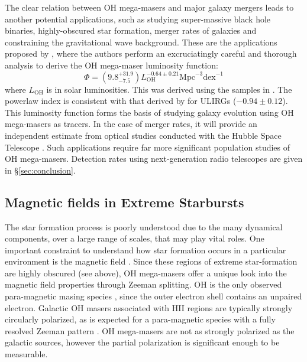 The clear relation between OH mega-masers and major galaxy mergers leads to another potential applications, such as studying super-massive black hole binaries, highly-obscured star formation, merger rates of galaxies \citep{darling_2001_merger} and constraining the gravitational wave background. These are the applications proposed by \citet{darling2002_lumfunc}, where the authors perform an excruciatingly careful and thorough analysis to derive the OH mega-maser luminosity function:
\begin{equation}
\label{eq:oh_lum}
\Phi = \left( 9.8^{+31.9}_{-7.5} \right)L_{\mathrm{OH}}^{-0.64\pm0.21} \mathrm{Mpc}^{-3} \mathrm{dex}^{-1}
\end{equation}
where $L_{\mathrm{OH}}$ is in solar luminosities. This was derived using the samples in \citet{darling2002_paperIII}. The powerlaw index is consistent with that derived by \citet{Kim_1998} for ULIRGs ($-0.94\pm0.12$). This luminosity function forms the basis of studying galaxy evolution using OH mega-masers as tracers. In the case of merger rates, it will provide an independent estimate from optical studies conducted with the Hubble Space Telescope \citep{Kim_1998}. Such applications require far more significant population studies of OH mega-masers. Detection rates using next-generation radio telescopes are given in \S\ref{sec:conclusion}.

\subsection{Magnetic fields in Extreme Starbursts}
\label{sub:oh_zeeman}

The star formation process is poorly understood due to the many dynamical components, over a large range of scales, that may play vital roles. One important constraint to understand how star formation occurs in a particular environment is the magnetic field \citep{McKee:2007bd}. Since these regions of extreme star-formation are highly obscured (see above), OH mega-masers offer a unique look into the magnetic field properties through Zeeman splitting. OH is the only observed para-magnetic masing species \citep{elitzur1992_text}, since the outer electron shell contains an unpaired electron. Galactic OH masers associated with HII regions are typically strongly circularly polarized, as is expected for a para-magnetic species with a fully resolved Zeeman pattern \citep{elitzur1992_text}. OH mega-masers are not as strongly polarized as the galactic sources, however the partial polarization is significant enough to be measurable.

